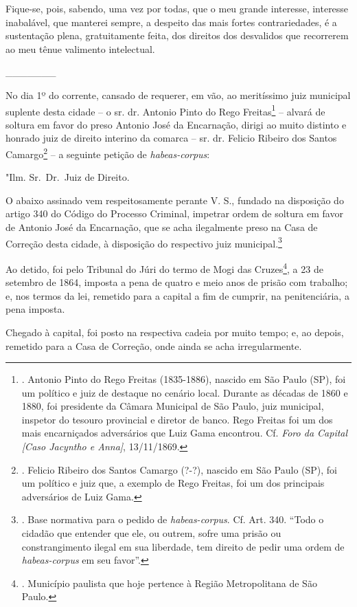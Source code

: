 Fique-se, pois, sabendo, uma vez por todas, que o meu grande interesse,
interesse inabalável, que manterei sempre, a despeito das mais fortes
contrariedades, é a sustentação plena, gratuitamente feita, dos direitos
dos desvalidos que recorrerem ao meu tênue valimento intelectual.

\_\_\_\_\_\_\_

No dia 1º do corrente, cansado de requerer, em vão, ao meritíssimo juiz
municipal suplente desta cidade -- o sr. dr. Antonio Pinto do Rego
Freitas\footnote{. Antonio Pinto do Rego Freitas (1835-1886), nascido em
  São Paulo (SP), foi um político e juiz de destaque no cenário local.
  Durante as décadas de 1860 e 1880, foi presidente da Câmara Municipal
  de São Paulo, juiz municipal, inspetor do tesouro provincial e diretor
  de banco. Rego Freitas foi um dos mais encarniçados adversários que
  Luiz Gama encontrou. Cf. \emph{Foro da Capital {[}Caso Jacyntho e
  Anna{]}}, 13/11/1869.} -- alvará de soltura em favor do preso Antonio
José da Encarnação, dirigi ao muito distinto e honrado juiz de direito
interino da comarca -- sr. dr. Felicio Ribeiro dos Santos
Camargo\footnote{. Felicio Ribeiro dos Santos Camargo (?-?), nascido em
  São Paulo (SP), foi um político e juiz que, a exemplo de Rego Freitas,
  foi um dos principais adversários de Luiz Gama.} -- a seguinte petição
de \emph{habeas-corpus}:

"Ilm. Sr.~Dr.~Juiz de Direito.

O abaixo assinado vem respeitosamente perante V. S., fundado na
disposição do artigo 340 do Código do Processo Criminal, impetrar ordem
de soltura em favor de Antonio José da Encarnação, que se acha
ilegalmente preso na Casa de Correção desta cidade, à disposição do
respectivo juiz municipal.\footnote{. Base normativa para o pedido de
  \emph{habeas-corpus}. Cf. Art. 340. ``Todo o cidadão que entender que
  ele, ou outrem, sofre uma prisão ou constrangimento ilegal em sua
  liberdade, tem direito de pedir uma ordem de \emph{habeas-corpus} em
  seu favor''.}

Ao detido, foi pelo Tribunal do Júri do termo de Mogi das
Cruzes\footnote{. Município paulista que hoje pertence à Região
  Metropolitana de São Paulo.}, a 23 de setembro de 1864, imposta a pena
de quatro e meio anos de prisão com trabalho; e, nos termos da lei,
remetido para a capital a fim de cumprir, na penitenciária, a pena
imposta.

Chegado à capital, foi posto na respectiva cadeia por muito tempo; e, ao
depois, remetido para a Casa de Correção, onde ainda se acha
irregularmente.

